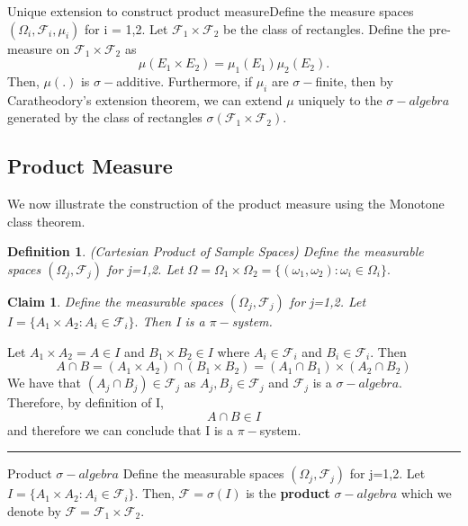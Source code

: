 \documentclass[twoside]{article}
\newtheorem{claim}[theorem]{Claim}
\newtheorem{definition}[theorem]{Definition}
\newenvironment{proof}{{\bf Proof:}}{\hfill\rule{2mm}{2mm}}
\newcommand{\sigmalgebra}{\mathcal{F}}
\newcommand{\sa}{\sigma-algebra}
\begin{document}
\begin{proposition_exam}{Unique extension to construct product measure}{}Define the measure spaces $(\Omega_i, \sigmalgebra_i, \mu_i)$ for i = 1,2. Let $\sigmalgebra_1 \times \sigmalgebra_2$ be the class of rectangles. Define the pre-measure on $\sigmalgebra_1 \times \sigmalgebra_2$ as
$$
\mu(E_1 \times E_2) = \mu_1(E_1)\mu_2(E_2).
$$
Then, $\mu(.)$ is $\sigma-$additive. Furthermore, if $\mu_i$ are $\sigma-$finite, then by Caratheodory's extension theorem, we can extend $\mu$ uniquely to the $\sa$ generated by the class of rectangles $\sigma(\sigmalgebra_1 \times \sigmalgebra_2).$
\end{proposition_exam}

\subsection{Product Measure}
We now illustrate the construction of the product measure using the Monotone class theorem.

\begin{definition}(Cartesian Product of Sample Spaces)
Define the measurable spaces $(\Omega_j, \sigmalgebra_j)$ for j=1,2. Let $\Omega = \Omega_1 \times \Omega_2 = \{(\omega_1, \omega_2): \omega_i \in \Omega_i\}.$
\end{definition}

\begin{claim}Define the measurable spaces $(\Omega_j, \sigmalgebra_j)$ for j=1,2. Let $I = \{A_1 \times A_2: A_i \in \sigmalgebra_i\}.$ Then I is a $\pi-$system.
\end{claim}

\begin{proof} Let $A_1 \times A_2 = A \in I$ and $B_1 \times B_2 \in I$ where $A_i \in \sigmalgebra_i$ and $B_i \in \sigmalgebra_i.$ Then
$$
A \cap B = (A_1 \times A_2) \cap (B_1 \times B_2) = (A_1 \cap B_1) \times (A_2 \cap B_2)
$$
We have that $(A_j \cap B_j) \in \sigmalgebra_j$ as $A_j, B_j \in \sigmalgebra_j$ and $\sigmalgebra_j$ is a $\sa.$ Therefore, by definition of I, 
$$
A \cap B \in I
$$
and therefore we can conclude that I is a $\pi-$system.
\end{proof}

\begin{definition_exam}{Product $\sa$}{}
Define the measurable spaces $(\Omega_j, \sigmalgebra_j)$ for j=1,2. Let $I = \{A_1 \times A_2: A_i \in \sigmalgebra_i\}.$ Then, $\sigmalgebra = \sigma(I)$ is the \textbf{product} $\sa$ which we denote by $\mathcal{\sigmalgebra} = \sigmalgebra_1 \times \sigmalgebra_2$.
\end{definition_exam}
\end{document}
